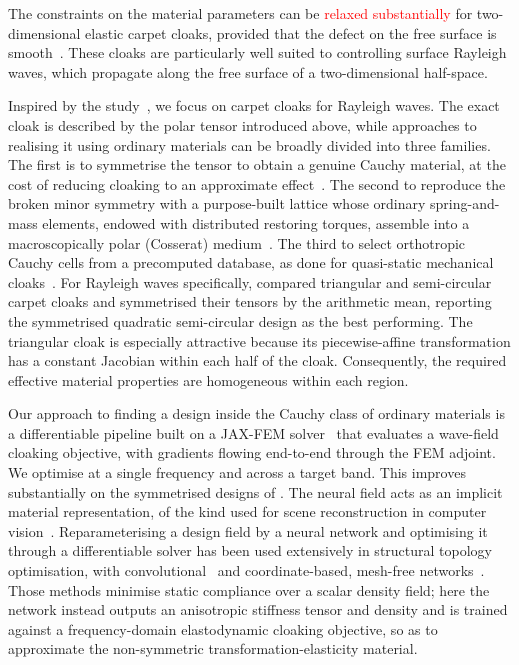 \documentclass[preprint,12pt]{elsarticle}
\begin{document}
The constraints on the material parameters can be  \textcolor{red}{relaxed substantially} for two-dimensional elastic carpet cloaks, provided that the defect on the free surface is smooth~\citep{quadrelli2021elastic}. These cloaks are particularly well suited to controlling surface Rayleigh waves, which propagate along the free surface of a two-dimensional half-space.

Inspired by the study~\citep{quadrelli2021elastic}, we focus on carpet cloaks for Rayleigh waves. The exact cloak is described by the polar tensor introduced above, while approaches to realising it using ordinary materials can be broadly divided into three families. The first is to symmetrise the tensor to obtain a genuine Cauchy material, at the cost of reducing cloaking to an approximate effect~\citep{norris2008,norris2011}.
The second to reproduce the broken minor symmetry with a purpose-built lattice whose
ordinary spring-and-mass elements, endowed with distributed restoring
torques, assemble into a macroscopically polar (Cosserat)
medium~\citep{nassar2018}. The third to select orthotropic Cauchy cells from a
precomputed database, as done for quasi-static mechanical
cloaks~\citep{wang2022}. For Rayleigh waves specifically,
\citet{chatzopoulos2023} compared triangular and semi-circular carpet
cloaks and symmetrised their tensors by the arithmetic mean, reporting the
symmetrised quadratic semi-circular design as the best performing.
The triangular cloak is especially attractive because its piecewise-affine transformation has a constant Jacobian within each half of the cloak. Consequently, the required effective material properties are homogeneous within each region.

Our approach to finding a design inside the Cauchy class of ordinary
materials is a differentiable pipeline built on a JAX-FEM solver~\citep{xu2020jaxfem}
that evaluates a wave-field cloaking objective, with gradients flowing
end-to-end through the FEM adjoint. We optimise
at a single frequency and across a target band. This
improves substantially on the symmetrised designs of
\citet{chatzopoulos2023}. The neural field acts as an implicit material
representation, of the kind used for scene reconstruction in computer
vision~\citep{mildenhall2020nerf,sitzmann2020siren,tancik2020fourier}.
Reparameterising a design field by a neural network and optimising it
through a differentiable solver has been used extensively in structural
topology optimisation, with convolutional~\citep{hoyer2019} and
coordinate-based, mesh-free networks~\citep{chandrasekhar2021,zehnder2021}.
Those methods minimise static compliance over a scalar density field; here
the network instead outputs an anisotropic stiffness tensor and density and
is trained against a frequency-domain elastodynamic cloaking objective, so
as to approximate the non-symmetric transformation-elasticity material.
\end{document}
